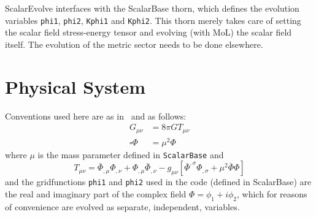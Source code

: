 ScalarEvolve interfaces with the ScalarBase thorn, which defines the evolution
variables \texttt{phi1}, \texttt{phi2}, \texttt{Kphi1} and \texttt{Kphi2}.
%
This thorn merely takes care of setting the scalar field stress-energy tensor
and evolving (with MoL) the scalar field itself. The evolution of the metric
sector needs to be done elsewhere.

\section{Physical System}

Conventions used here are as in~\cite{Scalar_Cunha:2017wao} and as follows:
\begin{align}
  G_{\mu \nu} & = 8 \pi G T_{\mu \nu} \\
  \square \Phi & = \mu^2 \Phi
\end{align}
where $\mu$ is the mass parameter defined in \texttt{ScalarBase} and
\begin{equation}
  T_{\mu \nu} = \bar \Phi_{,\mu} \Phi_{,\nu} + \Phi_{,\mu} \bar \Phi_{,\nu}
                - g_{\mu \nu} [  \bar \Phi^{,\sigma} \Phi_{,\sigma}
                               + \mu^2 \bar \Phi \Phi ]
\end{equation}
and the gridfunctions \texttt{phi1} and \texttt{phi2} used in the code (defined in ScalarBase) are the real and imaginary part of the
complex field $\Phi = \phi_1 + i \phi_2$, which for reasons of convenience are evolved as separate, independent, variables.

